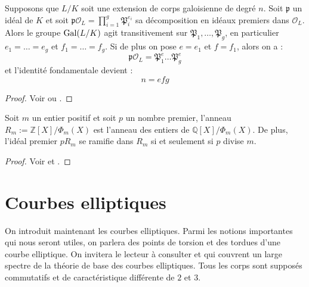 \documentclass[a4paper]{article} %
\numberwithin{section}{part}
\numberwithin{equation}{section}
\newcommand\QQ{\mathbb{Q}}
\newcommand\ZZ{\mathbb{Z}}
\newcommand\EO{\mathcal{O}}
\begin{document}
\begin{thm}
\label{th:fundidgal}
Supposons que $L/K$ soit une extension de corps galoisienne de degré $n$. Soit
$\mathfrak{p}$ un idéal de $K$ et soit $\mathfrak{p}\EO_L = 
\prod_{i=1}^{g}{\mathfrak{P}_i^{e_i}}$ sa décomposition en idéaux premiers dans
$\EO_L$. Alors le groupe $\textup{Gal}(L/K)$ agit transitivement sur
$\mathfrak{P}_1,\dots,\mathfrak{P}_g$, en particulier $e_1 = \dots = e_g$ et
$f_1 = \dots = f_g$. Si de plus on pose $e = e_1$ et $f = f_1$, alors on a :
\begin{equation}
\mathfrak{p}\EO_L = \mathfrak{P}_1^e\dots\mathfrak{P}_g^e
\end{equation}
et l'identité fondamentale devient :
\begin{equation}
n = efg
\end{equation}
\end{thm}
\begin{proof}
Voir \cite[p. 26, cor. 2]{Lan2} ou \cite[p. 105, prop. 1]{Sam}.
\end{proof}

\begin{thm}
\label{th:entiercycl}
Soit $m$ un entier positif et soit $p$ un nombre premier, l'anneau $R_m := 
\ZZ[X]/\Phi_m(X)$ est l'anneau des entiers de $\QQ[X]/\Phi_m(X)$. De plus, 
l'idéal premier $pR_m$ se ramifie dans $R_m$ si et seulement si $p$ divise $m$.
\end{thm}
\begin{proof}
Voir \cite[prop. 2.3]{Was1} et \cite[th. 2.6]{Was1}.
\end{proof}
\section{Courbes elliptiques}
On introduit maintenant les courbes elliptiques. Parmi les notions importantes 
qui nous seront utiles, on parlera des points de torsion et des tordues d'une 
courbe elliptique. On invitera le lecteur à consulter \cite{Sil} et \cite{Was2}
qui couvrent un large spectre de la théorie de base des courbes elliptiques.
Tous les corps sont supposés commutatifs et de caractéristique différente de $2$
et $3$.
\end{document}

